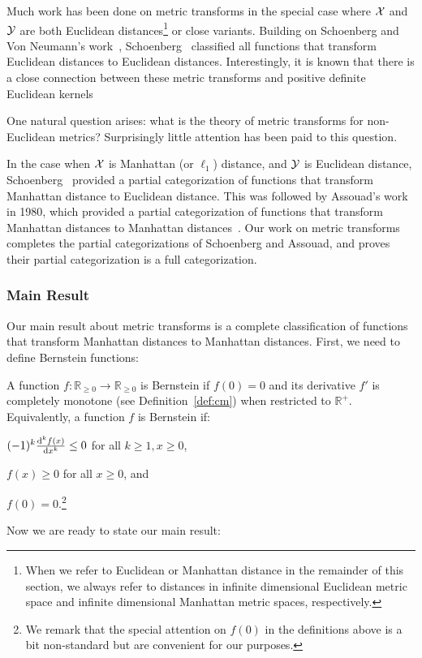 Much work has been done on metric transforms in the special case where ${\cal X}$ and ${\cal Y}$ are both Euclidean distances\footnote{When we refer to Euclidean or Manhattan distance in the remainder of this section, we always refer to distances in infinite dimensional Euclidean metric space and infinite dimensional Manhattan metric spaces, respectively.} or close variants.   
 Building on Schoenberg and Von Neumann's work~\cite{ns41}, Schoenberg~\cite{s38} classified all functions that transform Euclidean distances to Euclidean distances. 
 Interestingly, it is known that there is a close connection between these metric transforms and positive definite Euclidean kernels~\cite{s42, ss01}


 



 One natural question arises: what is the theory of metric transforms for non-Euclidean metrics? Surprisingly little attention has been paid to this question.
 
In the case when ${\cal X}$ is Manhattan (or $\ell_1$) distance, and ${\cal Y}$ is Euclidean distance, Schoenberg~\cite{s38} provided a partial categorization of functions that transform Manhattan distance to Euclidean distance. This was followed by Assouad's work in 1980, which provided a partial categorization of functions that transform Manhattan distances to Manhattan distances~\cite{a80}. Our work on metric transforms completes the partial categorizations of Schoenberg and Assouad, and proves their partial categorization is a full categorization. 


\subsubsection{Main Result}

Our main result about metric transforms is a complete classification of functions that transform Manhattan distances to Manhattan distances. First, we need to define Bernstein functions: 
\begin{definition}\label{def:bernstein}
  A function $f:\mathbb R_{\geq 0}\to \mathbb R_{\geq 0}$ is Bernstein if $f(0)=0$ and its derivative $f'$ is completely monotone (see Definition~\ref{def:cm}) when restricted to $\mathbb R^+$. 
  Equivalently, a function $f$ is Bernstein if:
\begin{tight_enumerate}
\item $(-1)^k \frac{\mathrm{d}^k f(x)}{\mathrm{d} x^k} \leq 0$ for all $k \geq 1, x \geq 0$,
\item $f(x) \geq 0$ for all $x \geq 0$, and
\item $f(0) = 0$.\footnote{We remark that the special attention on $f(0)$ in the definitions above is a bit non-standard but are convenient for our purposes.}
\end{tight_enumerate}
\end{definition}
Now we are ready to state our main result:

